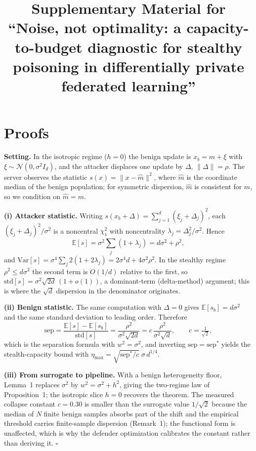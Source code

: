 \documentclass[final,1p,times]{elsarticle}
\begin{document}
\begin{frontmatter}
\title{Supplementary Material for\\
``Noise, not optimality: a capacity-to-budget diagnostic for
stealthy poisoning in differentially private federated learning''}
\end{frontmatter}

\section{Proofs}\label{app:proofs}
\textbf{Setting.} In the isotropic regime ($h{=}0$) the benign update
is $x_b=m+\xi$ with $\xi\sim\mathcal{N}(0,\sigma^2 I_d)$, and the
attacker displaces one update by $\Delta$, $\|\Delta\|=\rho$. The
server observes the statistic $s(x)=\|x-\hat m\|^2$, where $\hat m$ is
the coordinate median of the benign population; for symmetric
dispersion, $\hat m$ is consistent for $m$, so we condition on
$\hat m=m$.

\textbf{(i) Attacker statistic.} Writing
$s(x_b+\Delta)=\sum_{j=1}^{d}(\xi_j+\Delta_j)^2$, each
$(\xi_j+\Delta_j)^2/\sigma^2$ is a noncentral $\chi^2_1$ with
noncentrality $\lambda_j=\Delta_j^2/\sigma^2$. Hence
\[
  \mathbb{E}[s]=\sigma^2\textstyle\sum_j(1+\lambda_j)=d\sigma^2+\rho^2,
\]
and $\mathrm{Var}[s]=\sigma^4\sum_j 2(1+2\lambda_j)=2\sigma^4
d+4\sigma^2\rho^2$. In the stealthy regime $\rho^2\le d\sigma^2$ the
second term is $O(1/d)$ relative to the first, so
$\mathrm{std}[s]=\sigma^2\sqrt{2d}\,(1+o(1))$, a dominant-term
(delta-method) argument; this is where the $\sqrt{d}$ dispersion in
the denominator originates.

\textbf{(ii) Benign statistic.} The same computation with $\Delta=0$
gives $\mathbb{E}[s_b]=d\sigma^2$ and the same standard deviation to
leading order. Therefore
\[
  \mathrm{sep}
  =\frac{\mathbb{E}[s]-\mathbb{E}[s_b]}{\mathrm{std}[s]}
  =\frac{\rho^2}{\sigma^2\sqrt{2d}}
  =c\,\frac{\rho^2}{\sigma^2\sqrt{d}},
  \qquad c=\tfrac{1}{\sqrt{2}},
\]
which is the separation formula with $w^2=\sigma^2$, and inverting
$\mathrm{sep}=\mathrm{sep}^{*}$ yields the stealth-capacity bound with
$\eta_{\max}=\sqrt{\mathrm{sep}^{*}/c}\;\sigma\,d^{1/4}$.

\textbf{(iii) From surrogate to pipeline.} With a benign
heterogeneity floor, Lemma~1 replaces $\sigma^2$ by
$w^2=\sigma^2+h^2$, giving the two-regime law of
Proposition~1; the isotropic slice $h=0$ recovers
the theorem. The measured collapse constant $c=0.30$ is smaller than
the surrogate value $1/\sqrt{2}$ because the median of $N$ finite
benign samples absorbs part of the shift and the empirical threshold
carries finite-sample dispersion (Remark~1); the
functional form is unaffected, which is why the defender optimization
calibrates the constant rather than deriving it. \hfill$\square$
\end{document}
